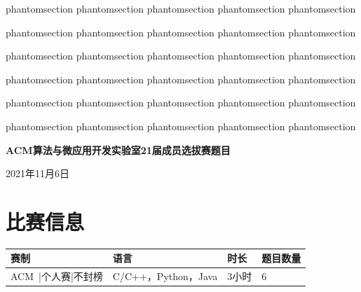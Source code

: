 \documentclass[
	lang=cn,
	color=green
]{elegantbook}
\makeatletter
\newcommand{\labeltext}[2]{%
  \@bsphack
  \csname phantomsection\endcsname %
  \def\@currentlabel{#1}{\label{#2}}%
  \@esphack
}
\makeatother
\begin{document}
\labeltext{K素数筛}{pro:1} 	\labeltext{3000ms}{tim:1} \labeltext{256M}{mem:1} \labeltext{传统}{typ:1} \labeltext{Tifa}{aut:1}
\labeltext{天马行空}{pro:2} \labeltext{1000ms}{tim:2} \labeltext{256M}{mem:2} \labeltext{传统}{typ:2} \labeltext{AgOH}{aut:2}
\labeltext{双端队列}{pro:3} \labeltext{1000ms}{tim:3} \labeltext{256M}{mem:3} \labeltext{传统}{typ:3} \labeltext{AgOH}{aut:3}
\labeltext{水的体积}{pro:4} \labeltext{1000ms}{tim:4} \labeltext{256M}{mem:4} \labeltext{传统}{typ:4} \labeltext{AgOH}{aut:4}
\labeltext{棋牌室}{pro:5} 	\labeltext{1000ms}{tim:5} \labeltext{256M}{mem:5} \labeltext{传统}{typ:5} \labeltext{Tifa}{aut:5}
\labeltext{xxx}{pro:6} 		\labeltext{1000ms}{tim:6} \labeltext{256M}{mem:6} \labeltext{传统}{typ:6} \labeltext{Tifa}{aut:6}

\begin{titlepage}
	\begin{center}
		\LARGE
		\textbf{ACM算法与微应用开发实验室21届成员选拔赛题目} \par
		\normalsize
		\vspace{0.5cm}
		2021年11月6日
	\end{center}

	\section*{比赛信息}
	\begin{tabularx}{450pt}{X|X|X|X}
		\toprule
		\textbf{赛制}       & \textbf{语言}       & \textbf{时长} & \textbf{题目数量} \\
		\midrule
		ACM\ |个人赛|不封榜 & C/C++，Python，Java & 3小时         & 6                 \\
		\bottomrule
	\end{tabularx}


\end{titlepage}
\end{document}
